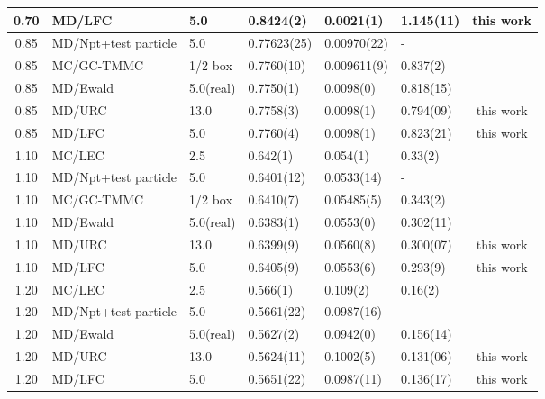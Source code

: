 \documentclass[aps,pre,preprint]{revtex4-1}
\begin{document}
\begin{table}
\begin{tabular*}{0.99\textwidth}{@{\extracolsep{\fill}}clllllc}
    0.70 & MD/LFC               & 5.0      & 0.8424(2)   & 0.0021(1)   & 1.145(11) & this work \\\hline
    0.85 & MD/Npt+test particle & 5.0      & 0.77623(25) & 0.00970(22) & -         & \cite{lotfi1992vapour}\\
    0.85 & MC/GC-TMMC           & 1/2 box  & 0.7760(10)  & 0.009611(9) & 0.837(2)  & \cite{errington2003evaluating}\\
    0.85 & MD/Ewald             & 5.0(real)& 0.7750(1)   & 0.0098(0)   & 0.818(15) & \cite{ismail2007application}\\
    0.85 & MD/URC               & 13.0     & 0.7758(3)   & 0.0098(1)   & 0.794(09) & this work \\
    0.85 & MD/LFC               & 5.0      & 0.7760(4)   & 0.0098(1)   & 0.823(21) & this work\\\hline
    1.10 & MC/LEC               & 2.5      & 0.642(1)    & 0.054(1)    & 0.33(2)   & \cite{janecek2006long}\\
    1.10 & MD/Npt+test particle & 5.0      & 0.6401(12)  & 0.0533(14)  & -         & \cite{lotfi1992vapour}\\
    1.10 & MC/GC-TMMC           & 1/2 box  & 0.6410(7)   & 0.05485(5)  & 0.343(2)  & \cite{errington2003evaluating}\\
    1.10 & MD/Ewald             & 5.0(real)& 0.6383(1)   & 0.0553(0)   & 0.302(11) & \cite{ismail2007application}\\
    1.10 & MD/URC               & 13.0     & 0.6399(9)   & 0.0560(8)   & 0.300(07) & this work\\
    1.10 & MD/LFC               & 5.0      & 0.6405(9)   & 0.0553(6)   & 0.293(9)  & this work\\ \hline
    1.20 & MC/LEC               & 2.5      & 0.566(1)    & 0.109(2)    & 0.16(2)   & \cite{janecek2006long}\\
    1.20 & MD/Npt+test particle & 5.0      & 0.5661(22)  & 0.0987(16)  & -         & \cite{lotfi1992vapour}\\
    1.20 & MD/Ewald             & 5.0(real)& 0.5627(2)   & 0.0942(0)   & 0.156(14) & \cite{ismail2007application}\\
    1.20 & MD/URC               & 13.0     & 0.5624(11)  & 0.1002(5)   & 0.131(06) & this work\\
    1.20 & MD/LFC               & 5.0      & 0.5651(22)  & 0.0987(11)  & 0.136(17) & this work\\
    \hline\hline
  \end{tabular*}
\end{table}
\end{document}
